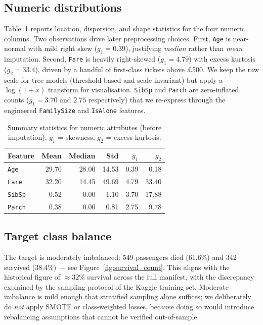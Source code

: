 \documentclass[10pt,a4paper,twocolumn]{article}
\begin{document}
\subsection{Numeric distributions}
Table~\ref{tab:numstats} reports location, dispersion, and shape statistics for the
four numeric columns. Two observations drive later preprocessing choices.
First, \texttt{Age} is near-normal with mild right skew ($g_1 = 0.39$), justifying
\emph{median} rather than \emph{mean} imputation. Second, \texttt{Fare} is heavily
right-skewed ($g_1 = 4.79$) with excess kurtosis ($g_2 = 33.4$), driven by a handful
of first-class tickets above £500. We keep the raw scale for tree models
(threshold-based and scale-invariant) but apply a $\log(1 + x)$ transform for
visualisation. \texttt{SibSp} and \texttt{Parch} are zero-inflated counts
($g_1 = 3.70$ and $2.75$ respectively) that we re-express through the engineered
\texttt{FamilySize} and \texttt{IsAlone} features.

\begin{table}[tb]
\centering\small
\caption{Summary statistics for numeric attributes (before imputation). $g_1$ = skewness,
$g_2$ = excess kurtosis.}
\label{tab:numstats}
\begin{tabular}{@{}lrrrrr@{}}
\toprule
Feature & Mean & Median & Std & $g_1$ & $g_2$ \\
\midrule
\texttt{Age}   & 29.70 & 28.00 & 14.53 & 0.39 & 0.18  \\
\texttt{Fare}  & 32.20 & 14.45 & 49.69 & 4.79 & 33.40 \\
\texttt{SibSp} & 0.52  & 0.00  & 1.10  & 3.70 & 17.88 \\
\texttt{Parch} & 0.38  & 0.00  & 0.81  & 2.75 & 9.78  \\
\bottomrule
\end{tabular}
\end{table}

\subsection{Target class balance}
The target is moderately imbalanced: 549 passengers died (61.6\%) and 342 survived
(38.4\%) --- see Figure~\ref{fig:survival_count}. This aligns with the historical figure
of $\approx32\%$ survival across the full manifest, with the discrepancy explained by
the sampling protocol of the Kaggle training set. Moderate imbalance is mild enough
that stratified sampling alone suffices; we deliberately do \emph{not} apply SMOTE or
class-weighted losses, because doing so would introduce rebalancing assumptions that
cannot be verified out-of-sample.
\end{document}
